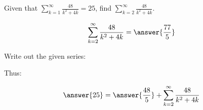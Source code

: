 \documentclass{ximera}
\author{Jim Talamo}
\begin{document}
\begin{exercise}
Given that $\sum_{k=1}^{\infty} \frac{48}{k^2+4k} = 25$, find $\sum_{k=2}^{\infty} \frac{48}{k^2+4k}$.

\[
\sum_{k=2}^{\infty} \frac{48}{k^2+4k} = \answer{\frac{77}{5}}
\]

\begin{hint}
Write out the given series: 
\begin{image}
  \end{image}
  
  Thus:
  
  \[
  \answer{25} = \answer{\frac{48}{5}} +\sum_{k=2}^{\infty}  \frac{48}{k^2+4k}
  \]
\end{hint}

\end{exercise}
\end{document}
